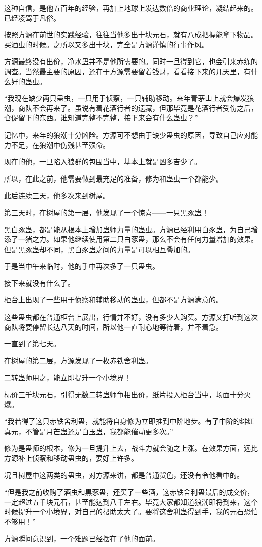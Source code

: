 \begin{this_body}
这种自信，是他五百年的经验，再加上地球上发达数倍的商业理论，凝结起来的。已经凌驾于凡俗。

按照方源在前世的实践经验，往往当他多出十块元石，就有八成把握能拿下物品。买酒虫的时候。之所以又多出十块，完全是方源谨慎的行事作风。

方源最终没有出价，净水蛊并不是他所需要的。同时一旦得到它，也会引来赤练的调查。当然最主要的原因，还在于方源需要留着钱财，看看接下来的几天里，有什么好的蛊虫。

“我现在缺少两只蛊虫，一只用于侦察，一只辅助移动。来年青茅山上就会爆发狼潮，商队不会再来了。虽说有着花酒行者的遗藏，但那毕竟是花酒行者受伤之后，仓促留下的东西。谁知道完整不完整，接下来会有什么蛊虫？”

记忆中，来年的狼潮十分凶险。方源可不想由于缺少蛊虫的原因，导致自己应对能力不足，在狼潮中伤残甚至殒命。

现在的他，一旦陷入狼群的包围当中，基本上就是凶多吉少了。

所以，在此之前，他需要做到最充足的准备，修为和蛊虫一个都能少。

此后连续三天，他多次来到树屋。

第三天时，在树屋的第一层，他发现了一个惊喜——一只黒豕蛊！

黑白豕蛊，都是能从根本上增加蛊师力量的蛊虫。方源已经利用白豕蛊，为自己增添了一猪之力。如果他继续使用第二只白豕蛊，那么不会有任何力量增加的效果。但是黒豕蛊却不同，黑白豕蛊之间的力量是可以相互叠加的。

于是当中午来临时，他的手中再次多了一只蛊虫。

接下来就没有什么了。

柜台上出现了一些用于侦察和辅助移动的蛊虫，但都不是方源满意的。

这些蛊虫都在普通柜台上展出，行情并不好，没有多少人购买。方源又打听到这次商队将要停留长达八天的时间，所以他一直耐心地等待着，并不着急。

一直到了第七天。

在树屋的第二层，方源发现了一枚赤铁舍利蛊。

二转蛊师用之，能立即提升一个小境界！

标价三千块元石，引得无数二转蛊师争相出价，纸片投入柜台当中，场面十分火爆。

“我若得了这只赤铁舍利蛊，就能将自身修为立即推到中阶地步。有了中阶的绯红真元，不管是月芒蛊还是白玉蛊，我都能催动更多次。”

修为是蛊师的根本，修为一旦提升上去，战斗力就会随之上涨。在效果方面，远比方源补上侦察和移动蛊虫的，要好上许多。

况且树屋中这两类的蛊虫，对方源来讲，都是普通货色，还没有令他看中的。

“但是我之前收购了酒虫和黒豕蛊，还买了一些酒，这赤铁舍利蛊最后的成交价，一定超过五千块元石，甚至能达到八千左右。毕竟大家都知道狼潮即将到来，这个时候提升一个小境界，对自己的帮助太大了。要将这舍利蛊得到手，我的元石恐怕不够用！”

方源瞬间意识到，一个难题已经摆在了他的面前。

\end{this_body}

